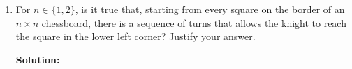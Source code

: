 \documentclass[11pt]{article}
\begin{document}
\begin{enumerate}
\begin{enumerate}
\begin{solution}
{\bf Solution:}\\
\end{solution}

\item
\begin{question}
For $n \in \{1,2\}$, is it true that, starting from every square on the border of an $n \times n$ chessboard, there is a sequence of turns
that allows the knight to reach the square in the lower left corner? Justify your answer.
\end{question}

\begin{solution}
{\bf Solution:}\\

\end{solution}
\end{enumerate}
\end{enumerate}
\end{document}

